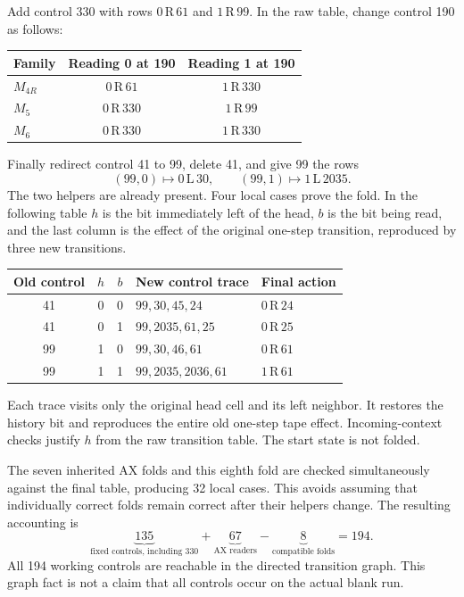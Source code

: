 \documentclass[10pt,letterpaper]{article}
\newcommand{\act}[3]{#1\,\mathrm{#2}\,#3}
\begin{document}
Add control 330 with rows $\act{0}{R}{61}$ and $\act{1}{R}{99}$. In the raw table, change control 190 as follows:
\begin{center}
\begin{tabular}{@{}lcc@{}}\toprule
Family & Reading 0 at 190 & Reading 1 at 190 \\\midrule
$M_{4R}$ & $\act{0}{R}{61}$ & $\act{1}{R}{330}$ \\
$M_5$ & $\act{0}{R}{330}$ & $\act{1}{R}{99}$ \\
$M_6$ & $\act{0}{R}{330}$ & $\act{1}{R}{330}$ \\
\bottomrule\end{tabular}
\end{center}
Finally redirect control 41 to 99, delete 41, and give 99 the rows
\[
  (99,0)\mapsto\act{0}{L}{30},\qquad
  (99,1)\mapsto\act{1}{L}{2035}.
\]
The two helpers are already present. Four local cases prove the fold. In the following table $h$ is the bit immediately left of the head, $b$ is the bit being read, and the last column is the effect of the original one-step transition, reproduced by three new transitions.
\begin{center}\small
\begin{tabular}{@{}cccll@{}}\toprule
Old control & $h$ & $b$ & New control trace & Final action \\\midrule
41 & 0 & 0 & $99,30,45,24$ & $\act{0}{R}{24}$ \\
41 & 0 & 1 & $99,2035,61,25$ & $\act{0}{R}{25}$ \\
99 & 1 & 0 & $99,30,46,61$ & $\act{0}{R}{61}$ \\
99 & 1 & 1 & $99,2035,2036,61$ & $\act{1}{R}{61}$ \\
\bottomrule\end{tabular}
\end{center}
Each trace visits only the original head cell and its left neighbor. It restores the history bit and reproduces the entire old one-step tape effect. Incoming-context checks justify $h$ from the raw transition table. The start state is not folded.

The seven inherited AX folds and this eighth fold are checked simultaneously against the final table, producing 32 local cases. This avoids assuming that individually correct folds remain correct after their helpers change. The resulting accounting is
\[
 \underbrace{135}_{\text{fixed controls, including 330}}
 +\underbrace{67}_{\text{AX readers}}
 -\underbrace{8}_{\text{compatible folds}}
 =\boxed{194}.
\]
All 194 working controls are reachable in the directed transition graph. This graph fact is not a claim that all controls occur on the actual blank run.
\end{document}
